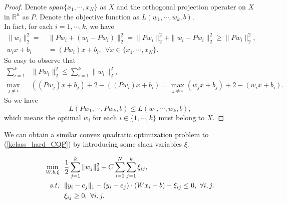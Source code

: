 \begin{proof}
Denote $span\{x_1,\cdots,x_N\}$ as $X$ and the orthogonal projection operater on $X$ in $\mathbb{R}^n$ as $P$. Denote the objective function as $L(w_1,\cdots,w_k,b)$.\\
In fact, for each $i = 1,\cdots,k$, we have
\begin{align}
\|w_i\|_2^2 = ~&\|Pw_i + (w_i-Pw_i)\|_2^2 = \|Pw_i\|_2^2+\|w_i-Pw_i\|_2^2\geq \|Pw_i\|_2^2,\\
w_ix+b_i &= (Pw_i) x + b_i,~~\forall x \in\{x_1,\cdots,x_N\}.
\end{align}
So easy to observe that
\begin{align}
\sum_{i=1}^k &\|Pw_i\|_2^2\leq \sum_{i=1}^k \|w_i\|_2^2,\\
\max_{j\neq i} &((Pw_j)x + b_j) + 2 - ((Pw_i)x+b_i) = \max_{j\neq i} (w_jx + b_j) + 2 - (w_ix+b_i).
\end{align}
So we have
\begin{equation}
L(Pw_1,\cdots,Pw_k,b)\leq L(w_1,\cdots,w_k,b),
\end{equation}
which means the optimal $w_i$ for each $i\in\{1,\cdots,k\}$ must belong to $X$.
\end{proof}

We can obtain a similar convex quadratic optimization problem to (\ref{kclass_hard_CQP}) by introducing some slack variables $\xi$.

\begin{equation}{\label{kclass_soft_CQP}}
\begin{aligned}
\min_{W,b,\xi} ~~& \frac{1}{2}\displaystyle\sum_{j=1}^k \|w_j\|_2^2+C\displaystyle\sum_{i=1}^N\displaystyle\sum_{j=1}^k \xi_{ij},\\
s.t.               ~~& \|y_i - e_j\|_1 - (y_i - e_j)\cdot (Wx_i+b)-\xi_{ij} \leq 0,~\forall i,j.\\
                        & \xi_{ij} \geq 0,~\forall i,j.
\end{aligned}
\end{equation}

